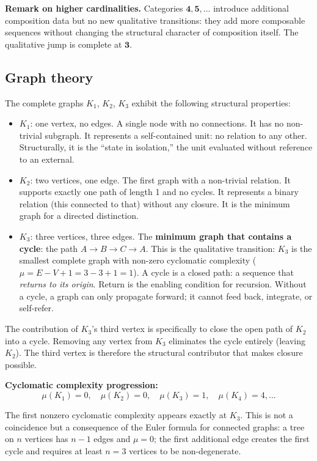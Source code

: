 \documentclass[12pt]{article}
\begin{document}
\textbf{Remark on higher cardinalities.} Categories
\(\mathbf{4}, \mathbf{5}, \ldots\) introduce additional composition data
but no new qualitative transitions: they add more composable sequences
without changing the structural character of composition itself. The
qualitative jump is complete at \(\mathbf{3}\).

\subsection{Graph theory}\label{graph-theory}

The complete graphs \(K_1\), \(K_2\), \(K_3\) exhibit the following
structural properties:

\begin{itemize}
\item
  \(K_1\): one vertex, no edges. A single node with no connections. It
  has no non-trivial subgraph. It represents a self-contained unit: no
  relation to any other. Structurally, it is the ``state in isolation,''
  the unit evaluated without reference to an external.
\item
  \(K_2\): two vertices, one edge. The first graph with a non-trivial
  relation. It supports exactly one path of length 1 and no cycles. It
  represents a binary relation (this connected to that) without any
  closure. It is the minimum graph for a directed distinction.
\item
  \(K_3\): three vertices, three edges. The \textbf{minimum graph that
  contains a cycle}: the path \(A \to B \to C \to A\). This is the
  qualitative transition: \(K_3\) is the smallest complete graph with
  non-zero cyclomatic complexity (\(\mu = E - V + 1 = 3 - 3 + 1 = 1\)).
  A cycle is a closed path: a sequence that \emph{returns to its
  origin}. Return is the enabling condition for recursion. Without a
  cycle, a graph can only propagate forward; it cannot feed back,
  integrate, or self-refer.
\end{itemize}

The contribution of \(K_3\)'s third vertex is specifically to close the
open path of \(K_2\) into a cycle. Removing any vertex from \(K_3\)
eliminates the cycle entirely (leaving \(K_2\)). The third vertex is
therefore the structural contributor that makes closure possible.

\textbf{Cyclomatic complexity progression:}
\[\mu(K_1) = 0, \quad \mu(K_2) = 0, \quad \mu(K_3) = 1, \quad \mu(K_4) = 4, \ldots\]

The first nonzero cyclomatic complexity appears exactly at \(K_3\). This
is not a coincidence but a consequence of the Euler formula for
connected graphs: a tree on \(n\) vertices has \(n-1\) edges and
\(\mu = 0\); the first additional edge creates the first cycle and
requires at least \(n = 3\) vertices to be non-degenerate.
\end{document}

